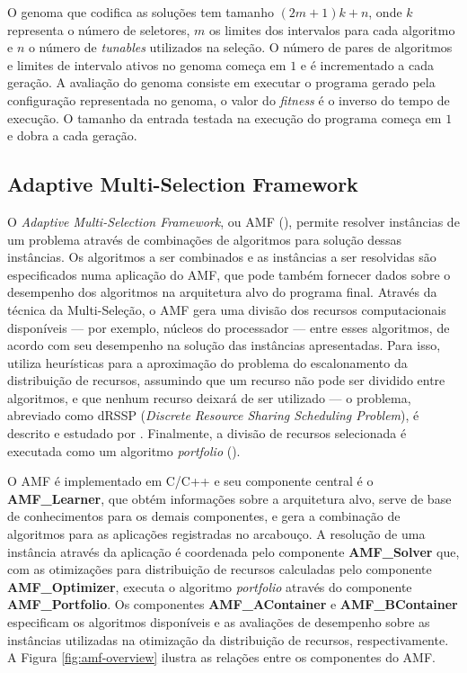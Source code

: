\documentclass[a4paper, 11pt]{article}
\begin{document}
O genoma que codifica as soluções tem tamanho $(2m + 1)k + n$,
onde $k$ representa o número de seletores, $m$ os
limites dos intervalos para cada algoritmo e $n$ o número de \emph{tunables} 
utilizados na seleção. O número de pares de algoritmos e limites de intervalo
ativos no genoma começa em $1$ e é incrementado a cada geração.
A avaliação do genoma consiste em executar o programa gerado pela
configuração representada no genoma, o valor do \emph{fitness} é o inverso
do tempo de execução. O tamanho da entrada testada na execução do programa
começa em $1$ e dobra a cada geração.

\subsection{Adaptive Multi-Selection Framework} \label{sec:amf}

O \emph{Adaptive Multi-Selection Framework}, ou AMF 
(\citet{goldman2012framework}), permite resolver instâncias de um problema 
através de combinações de algoritmos para solução dessas instâncias. 
Os algoritmos a ser combinados e as instâncias a ser resolvidas são
especificados numa aplicação do AMF, que pode também fornecer dados sobre
o desempenho dos algoritmos na arquitetura alvo do programa final.
Através da técnica da Multi-Seleção, o AMF gera uma divisão dos recursos 
computacionais disponíveis --- por exemplo, núcleos do processador --- entre 
esses algoritmos, de acordo com seu desempenho na solução das instâncias 
apresentadas. Para isso, utiliza heurísticas para a aproximação do problema do
escalonamento da distribuição de recursos, assumindo que
um recurso não pode ser dividido entre algoritmos, e que nenhum recurso 
deixará de ser utilizado --- o problema, abreviado como dRSSP (\emph{Discrete 
Resource Sharing Scheduling Problem}), é descrito e estudado por 
\citet{bougeret2009combining,bougeret2011approximating}. Finalmente,
a divisão de recursos selecionada é executada como um algoritmo 
\emph{portfolio} (\citet{huberman1997economics}).

O AMF é implementado em C/C++ e seu componente central é o 
\textbf{AMF\_Learner}, que obtém informações sobre a arquitetura
alvo, serve de base de conhecimentos para os demais componentes,
e gera a combinação de algoritmos para as aplicações registradas no
arcabouço. A resolução de uma instância através da aplicação é coordenada pelo 
componente \textbf{AMF\_Solver} que, com as otimizações para distribuição de 
recursos calculadas pelo componente \textbf{AMF\_Optimizer}, executa o 
algoritmo \emph{portfolio} através do componente \textbf{AMF\_Portfolio}.
Os componentes \textbf{AMF\_AContainer} e \textbf{AMF\_BContainer} especificam
os algoritmos disponíveis e as avaliações de desempenho sobre as instâncias
utilizadas na otimização da distribuição de recursos, respectivamente. A Figura
\ref{fig:amf-overview} ilustra as relações entre os componentes do AMF.
\end{document}
